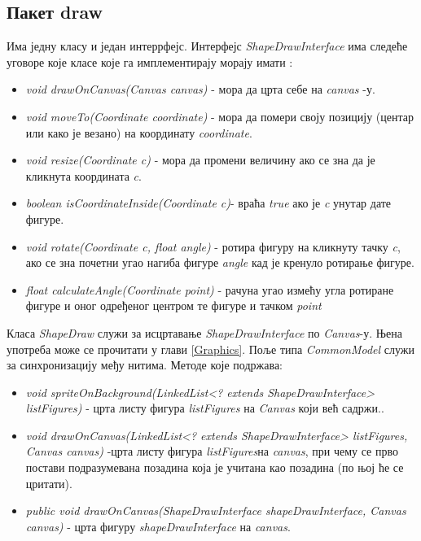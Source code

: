 \subsection{Пакет draw}
Има једну класу и један интеррфејс. 
Интерфејс \emph{ShapeDrawInterface} има следеће уговоре које класе које га имплементирају морају имати :
\begin{itemize}
\item \emph{void drawOnCanvas(Canvas canvas)} - мора да црта себе на \emph{canvas} -у.
\item \emph{void moveTo(Coordinate coordinate)} - мора да помери своју позицију (центар или како је везано) на координату \emph{coordinate}.
\item \emph{void resize(Coordinate c)} - мора да промени величину ако се зна да је кликнута координата \emph{c}.
\item \emph{boolean isCoordinateInside(Coordinate c)}- враћа \emph{true} ако је \emph{c} унутар дате фигуре.
\item \emph{void rotate(Coordinate c, float angle)}  - ротира фигуру на кликнуту тачку \emph{c}, ако се зна почетни угао нагиба фигуре  \emph{angle} кад је кренуло ротирање фигуре.  
\item \emph{float calculateAngle(Coordinate point)}  - рачуна угао измећу угла ротиране фигуре и оног одређеног центром те фигуре и тачком \emph{point}
\end{itemize}

Класа \emph{ShapeDraw} служи за исцртавање \emph{ShapeDrawInterface} по \emph{Canvas}-у. Њена употреба може се прочитати у глави \ref{Graphics}. Поље типа \emph{CommonModel} служи за синхронизацију међу нитима. Методе које подржава:
\begin{itemize}
\item \emph{void spriteOnBackground(LinkedList<? extends ShapeDrawInterface> listFigures)} - црта листу фигура \emph{listFigures} на \emph{Canvas} који већ садржи..
\item \emph{void drawOnCanvas(LinkedList<? extends ShapeDrawInterface> listFigures, Canvas canvas)} -црта листу фигура \emph{listFigures}на \emph{canvas}, при чему се прво постави подразумевана позадина која је учитана као позадина (по њој ће се цритати).
\item \emph{public void drawOnCanvas(ShapeDrawInterface shapeDrawInterface, Canvas canvas)} - црта фигуру \emph{shapeDrawInterface }на \emph{canvas}.
\end{itemize}

